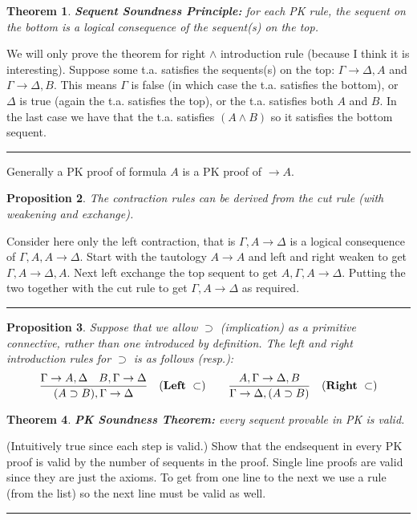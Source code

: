 \documentclass[twoside]{article}
\newcounter{lecnum}
\newtheorem{theorem}{Theorem}[lecnum]
\newtheorem{proposition}[theorem]{Proposition}
\newenvironment{proof}{{\bf Proof:}}{\hfill\rule{2mm}{2mm}}
\begin{document}
\begin{theorem}
\textbf{Sequent Soundness Principle:} for each PK rule, the sequent on the bottom is a logical consequence of the sequent(s) on the top.
\end{theorem}
\begin{proof}
We will only prove the theorem for right $\land$ introduction rule (because I think it is interesting). Suppose some t.a. satisfies the sequents(s) on the top: $\Gamma \rightarrow \Delta, A$ and $\Gamma \rightarrow \Delta, B$. This means $\Gamma$ is false (in which case the t.a. satisfies the bottom), or $\Delta$ is true (again the t.a. satisfies the top), or the t.a. satisfies both $A$ and $B$. In the last case we have that the t.a. satisfies $(A \land B)$ so it satisfies the bottom sequent.  
\end{proof}

Generally a PK proof of formula $A$ is a PK proof of $\rightarrow A$. 

\begin{proposition}
The contraction rules can be derived from the cut rule (with weakening and exchange).
\end{proposition}
\begin{proof}
Consider here only the left contraction, that is $\Gamma, A \rightarrow \Delta$ is a logical consequence of $\Gamma, A, A \rightarrow \Delta$. Start with the tautology $A \rightarrow A$ and left and right weaken to get $\Gamma, A \rightarrow \Delta, A$. Next left exchange the top sequent to get $A, \Gamma, A \rightarrow \Delta$. Putting the two together with the cut rule to get $\Gamma, A \rightarrow \Delta$ as required.  
\end{proof}

\begin{proposition}
Suppose that we allow $\supset$ (implication) as a primitive connective, rather than one introduced by definition. The left and right introduction rules for $\supset$ is as follows (resp.):
\[\frac{\Gamma \rightarrow A, \Delta \quad B, \Gamma \rightarrow \Delta}{(A \supset B), \Gamma \rightarrow \Delta}\quad (\mbox{\textbf{Left} }\subset )\qquad\frac{A, \Gamma \rightarrow \Delta, B}{\Gamma \rightarrow \Delta, (A \supset B)}\quad (\mbox{\textbf{Right} }\subset )\]
\end{proposition}

\begin{theorem}
\textbf{PK Soundness Theorem:} every sequent provable in PK is valid.
\end{theorem}
\begin{proof}
(Intuitively true since each step is valid.) Show that the endsequent in every PK proof is valid by the number of sequents in the proof. Single line proofs are valid since they are just the axioms. To get from one line to the next we use a rule (from the list) so the next line must be valid as well. 
\end{proof}
\end{document}
